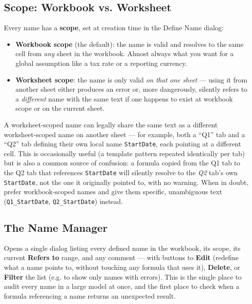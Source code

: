 \documentclass[11pt,a4paper]{article}
\newcommand{\key}[1]{\texttt{\colorbox{black!8}{\textbf{#1}}}}
\begin{document}
\subsection{Scope: Workbook vs. Worksheet}
\label{sec:namescope}

Every name has a \textbf{scope}, set at creation time in the Define Name dialog:

\begin{itemize}
  \item \textbf{Workbook scope} (the default): the name is valid and resolves to the same cell from \emph{any} sheet in the workbook. Almost always what you want for a global assumption like a tax rate or a reporting currency.
  \item \textbf{Worksheet scope}: the name is only valid \emph{on that one sheet} --- using it from another sheet either produces an error or, more dangerously, silently refers to a \emph{different} name with the same text if one happens to exist at workbook scope or on the current sheet.
\end{itemize}

\begin{pitfall}
A worksheet-scoped name can legally share the same text as a different worksheet-scoped name on another sheet --- for example, both a ``Q1'' tab and a ``Q2'' tab defining their own local name \texttt{StartDate}, each pointing at a different cell. This is occasionally useful (a template pattern repeated identically per tab) but is also a common source of confusion: a formula copied from the Q1 tab to the Q2 tab that references \texttt{StartDate} will silently resolve to the \emph{Q2} tab's own \texttt{StartDate}, not the one it originally pointed to, with no warning. When in doubt, prefer workbook-scoped names and give them specific, unambiguous text (\texttt{Q1\_StartDate}, \texttt{Q2\_StartDate}) instead.
\end{pitfall}

\subsection{The Name Manager}

\begin{formulasyntax}[Formulas $\rightarrow$ Name Manager \textnormal{(or} \key{Ctrl+F3}\textnormal{)}]
Opens a single dialog listing every defined name in the workbook, its scope, its current \textbf{Refers to} range, and any comment --- with buttons to \textbf{Edit} (redefine what a name points to, without touching any formula that uses it), \textbf{Delete}, or \textbf{Filter} the list (e.g. to show only names with errors). This is the single place to audit every name in a large model at once, and the first place to check when a formula referencing a name returns an unexpected result.
\end{formulasyntax}
\end{document}
